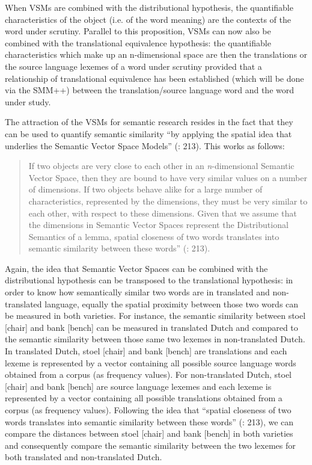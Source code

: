 When VSMs are combined with the distributional hypothesis, the quantifiable characteristics of the object (i.e. of the word meaning) are the contexts of the word under scrutiny. Parallel to this proposition, VSMs can now also be combined with the translational equivalence hypothesis: the quantifiable characteristics which make up an n-dimensional space are then the translations or the source language lexemes of a word under scrutiny provided that a relationship of translational equivalence has been established (which will be done via the SMM++) between the translation/source language word and the word under study.



The attraction of the VSMs for semantic research resides in the fact that they can be used to quantify semantic similarity “by applying the spatial idea that underlies the Semantic Vector Space Models” (\citealt{szmrecsanyi_semantic_2014}: 213). This works as follows:


\begin{quote}
If two objects are very close to each other in an \textit{n}{}-dimensional Semantic Vector Space, then they are bound to have very similar values on a number of dimensions. If two objects behave alike for a large number of characteristics, represented by the dimensions, they must be very similar to each other, with respect to these dimensions. Given that we assume that the dimensions in Semantic Vector Spaces represent the Distributional Semantics of a lemma, spatial closeness of two words translates into semantic similarity between these words” (\citealt{szmrecsanyi_semantic_2014}: 213).
\end{quote}


Again, the idea that Semantic Vector Spaces can be combined with the distributional hypothesis can be transposed to the translational hypothesis: in order to know how semantically similar two words are in translated and non-translated language, equally the spatial proximity between those two words can be measured in both varieties. For instance, the semantic similarity between stoel [chair] and bank [bench] can be measured in translated Dutch and compared to the semantic similarity between those same two lexemes in non-translated Dutch. In translated Dutch, stoel [chair] and bank [bench] are translations and each lexeme is represented by a vector containing all possible source language words obtained from a corpus (as frequency values). For non-translated Dutch, stoel [chair] and bank [bench] are source language lexemes and each lexeme is represented by a vector containing all possible translations obtained from a corpus (as frequency values). Following the idea that “spatial closeness of two words translates into semantic similarity between these words” (\citealt{szmrecsanyi_semantic_2014}: 213), we can compare the distances between stoel [chair] and bank [bench] in both varieties and consequently compare the semantic similarity between the two lexemes for both translated and non-translated Dutch. 



